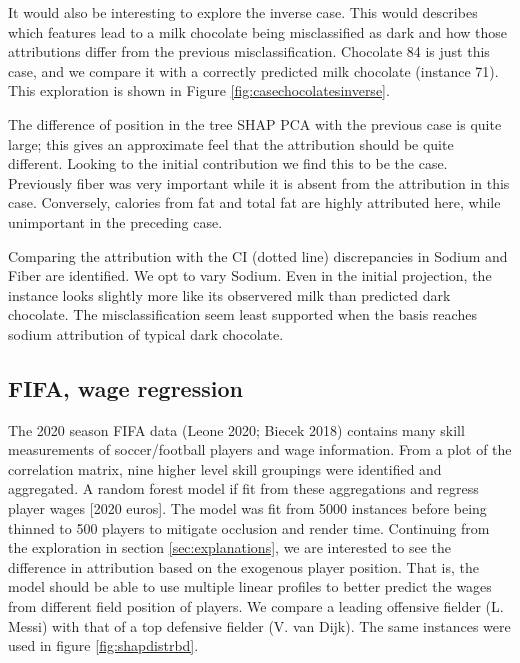 \documentclass[
]{article}
\begin{document}
It would also be interesting to explore the inverse case. This would describes which features lead to a milk chocolate being misclassified as dark and how those attributions differ from the previous misclassification. Chocolate 84 is just this case, and we compare it with a correctly predicted milk chocolate (instance 71). This exploration is shown in Figure \ref{fig:casechocolatesinverse}.

The difference of position in the tree SHAP PCA with the previous case is quite large; this gives an approximate feel that the attribution should be quite different. Looking to the initial contribution we find this to be the case. Previously fiber was very important while it is absent from the attribution in this case. Conversely, calories from fat and total fat are highly attributed here, while unimportant in the preceding case.

Comparing the attribution with the CI (dotted line) discrepancies in Sodium and Fiber are identified. We opt to vary Sodium. Even in the initial projection, the instance looks slightly more like its observered milk than predicted dark chocolate. The misclassification seem least supported when the basis reaches sodium attribution of typical dark chocolate.

\hypertarget{fifa-wage-regression}{%
\subsection{FIFA, wage regression}\label{fifa-wage-regression}}

The 2020 season FIFA data (Leone 2020; Biecek 2018) contains many skill measurements of soccer/football players and wage information. From a plot of the correlation matrix, nine higher level skill groupings were identified and aggregated. A random forest model if fit from these aggregations and regress player wages {[}2020 euros{]}. The model was fit from 5000 instances before being thinned to 500 players to mitigate occlusion and render time. Continuing from the exploration in section \ref{sec:explanations}, we are interested to see the difference in attribution based on the exogenous player position. That is, the model should be able to use multiple linear profiles to better predict the wages from different field position of players. We compare a leading offensive fielder (L. Messi) with that of a top defensive fielder (V. van Dijk). The same instances were used in figure \ref{fig:shapdistrbd}.
\end{document}
